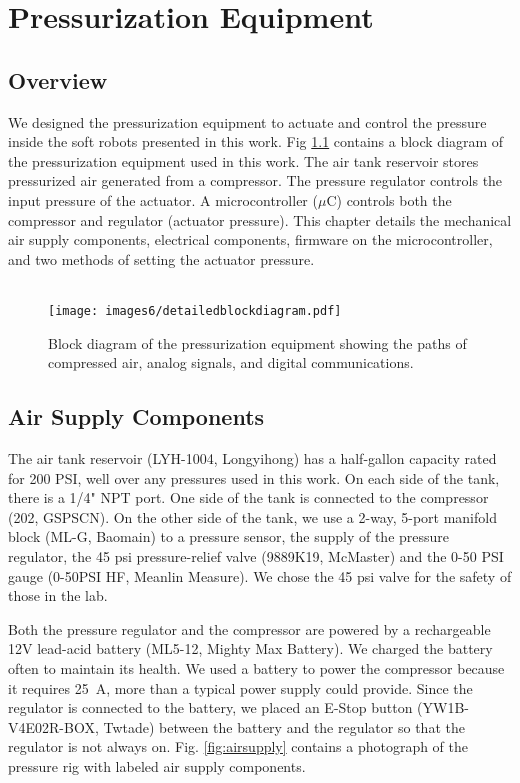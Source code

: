 \chapter{Pressurization Equipment}

\section*{Overview}

We designed the pressurization equipment to actuate and control the pressure inside the soft robots presented in this work. Fig \ref{fig:blockdiagram} contains a block diagram of the pressurization equipment used in this work.   The air tank reservoir stores pressurized air generated from a compressor. The pressure regulator controls the input pressure of the actuator. A microcontroller ($\mu$C) controls both the compressor and regulator (actuator pressure). This chapter details the mechanical air supply components, electrical components, firmware on the microcontroller, and two methods of setting the actuator pressure. \\ \\

\begin{figure}[!ht]
    \centering
    \texttt{[image: images6/detailedblockdiagram.pdf]}
    \caption{Block diagram of the pressurization equipment showing the paths of compressed air, analog signals, and digital communications.}
    \label{fig:blockdiagram}
\end{figure}

\section{Air Supply Components}

The air tank reservoir (LYH-1004, Longyihong) has a half-gallon capacity rated for 200 PSI, well over any pressures used in this work. On each side of the tank, there is a 1/4" NPT port. One side of the tank is connected to the compressor (202, GSPSCN). On the other side of the tank, we use a 2-way, 5-port manifold block (ML-G, Baomain) to a pressure sensor, the supply of the pressure regulator, the 45 psi pressure-relief valve (9889K19, McMaster) and the 0-50 PSI gauge (0-50PSI HF, Meanlin Measure). We chose the 45 psi valve for the safety of those in the lab.

Both the pressure regulator and the compressor are powered by a rechargeable 12V lead-acid battery (ML5-12, Mighty Max Battery). We charged the battery often to maintain its health. We used a battery to power the compressor because it requires 25~A, more than a typical power supply could provide. Since the regulator is connected to the battery, we placed an E-Stop button (YW1B-V4E02R-BOX, Twtade) between the battery and the regulator so that the regulator is not always on. Fig. \ref{fig:airsupply} contains a photograph of the pressure rig with labeled air supply components. 

